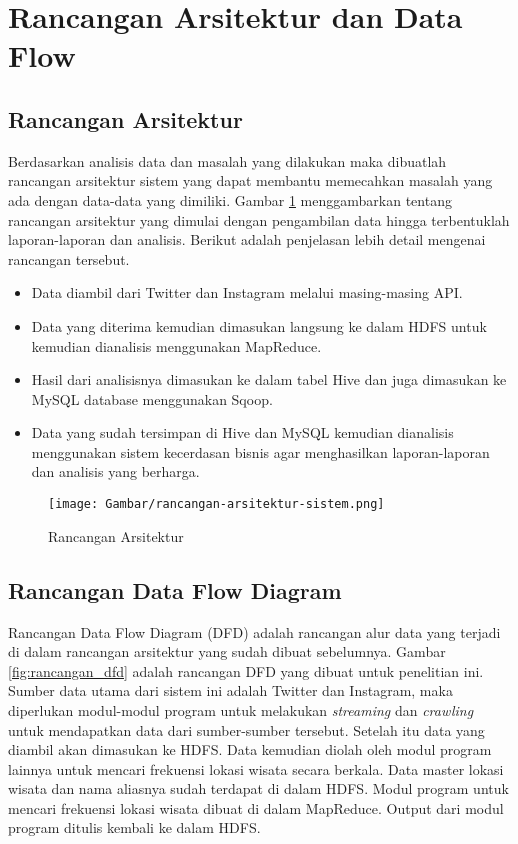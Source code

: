 \section{Rancangan Arsitektur dan Data Flow}
\subsection{Rancangan Arsitektur}
Berdasarkan analisis data dan masalah yang dilakukan maka dibuatlah rancangan arsitektur sistem yang dapat membantu memecahkan masalah yang ada dengan data-data yang dimiliki. Gambar \ref{fig:rancangan_arsitektur} menggambarkan tentang rancangan arsitektur yang dimulai dengan pengambilan data hingga terbentuklah laporan-laporan dan analisis. Berikut adalah penjelasan lebih detail mengenai rancangan tersebut.

\begin{itemize}
	\item Data diambil dari Twitter dan Instagram melalui masing-masing API.
	\item Data yang diterima kemudian dimasukan langsung ke dalam HDFS untuk kemudian dianalisis menggunakan MapReduce.
	\item Hasil dari analisisnya dimasukan ke dalam tabel Hive dan juga dimasukan ke MySQL database menggunakan Sqoop.
	\item Data yang sudah tersimpan di Hive dan MySQL kemudian dianalisis menggunakan sistem kecerdasan bisnis agar menghasilkan laporan-laporan dan analisis yang berharga.
\end{itemize}

\begin{figure}[H]
	\centering
	\texttt{[image: Gambar/rancangan-arsitektur-sistem.png]}
	\caption[Rancangan Arsitektur]{Rancangan Arsitektur} 
	\label{fig:rancangan_arsitektur}
\end{figure}


\subsection{Rancangan Data Flow Diagram}
Rancangan Data Flow Diagram (DFD) adalah rancangan alur data yang terjadi di dalam rancangan arsitektur yang sudah dibuat sebelumnya. Gambar \ref{fig:rancangan_dfd} adalah rancangan DFD yang dibuat untuk penelitian ini. Sumber data utama dari sistem ini adalah Twitter dan Instagram, maka diperlukan modul-modul program untuk melakukan \textit{streaming} dan \textit{crawling} untuk mendapatkan data dari sumber-sumber tersebut. Setelah itu data yang diambil akan dimasukan ke HDFS. Data kemudian diolah oleh modul program lainnya untuk mencari frekuensi lokasi wisata secara berkala. Data master lokasi wisata dan nama aliasnya sudah terdapat di dalam HDFS. Modul program untuk mencari frekuensi lokasi wisata dibuat di dalam MapReduce. Output dari modul program ditulis kembali ke dalam HDFS.

